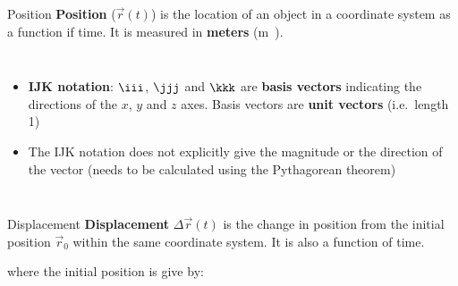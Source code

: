 \documentclass[12pt,compress,aspectratio=169,dvipsnames]{beamer}
\begin{document}
\begin{frame}{Position}
  \textbf{Position} ($\vec r(t)$) is the location of an object in a coordinate
  system as a function if time. It is measured in \textbf{meters}
  (\si\metre).
  \begin{columns}

    \begin{itemize}
    \item\vspace{-.1in}\textbf{IJK notation}: $\iii$, $\jjj$ and $\kkk$ are
      \textbf{basis vectors} indicating the directions of the $x$, $y$ and $z$
      axes. Basis vectors are \textbf{unit vectors} (i.e.\ length 1)
    \item The IJK notation does not explicitly give the magnitude or the
      direction of the vector (needs to be calculated using the Pythagorean
      theorem)
    \end{itemize}

  \end{columns}
\end{frame}



\begin{frame}{Displacement}
  \textbf{Displacement} $\Delta\vec r(t)$ is the change in position from the
  initial position $\vec r_0$ within the same coordinate system. It is also a
  function of time.


  where the initial position is give by:

  
\end{frame}
\end{document}
